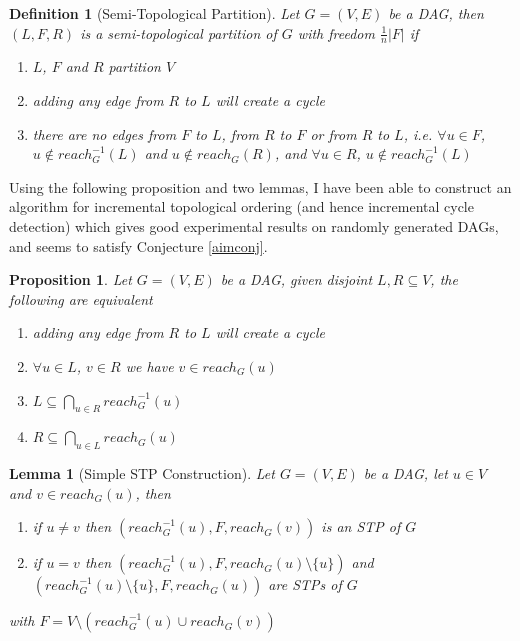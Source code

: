 \documentclass{article}
\newtheorem{lemma}[theorem]{Lemma}
\newtheorem{proposition}[theorem]{Proposition}
\newtheorem{definition}[theorem]{Definition}
\begin{document}
\begin{definition}[Semi-Topological Partition]
Let $G=(V,E)$ be a DAG, then $(L,F,R)$ is a \textit{semi-topological partition} of $G$ with \textit{freedom} $\frac{1}{n} \vert F \vert$ if
\begin{enumerate}
\item $L$, $F$ and $R$ partition $V$
\item adding any edge from $R$ to $L$ will create a cycle
\item there are no edges from $F$ to $L$, from $R$ to $F$ or from $R$ to $L$, i.e. $\forall u \in F$, $u \notin reach_{G}^{-1}(L)$ and $u \notin reach_{G}(R)$, and $\forall u \in R$, $u \notin reach_{G}^{-1}(L)$ 
\end{enumerate}
\end{definition}

Using the following proposition and two lemmas, I have been able to construct an algorithm for incremental topological ordering (and hence incremental cycle detection) which gives good experimental results on randomly generated DAGs, and seems to satisfy Conjecture \ref{aimconj}.

\begin{proposition}
Let $G=(V,E)$ be a DAG, given disjoint $L,R \subseteq V$, the following are equivalent
\begin{enumerate}
\item adding any edge from $R$ to $L$ will create a cycle
\item $\forall u \in L$, $v \in R$ we have $v \in reach_{G}(u)$
\item $L \subseteq \bigcap_{u \in R} reach_{G}^{-1}(u)$
\item $R \subseteq \bigcap_{u \in L} reach_{G}(u)$
\end{enumerate}
\end{proposition}

\begin{lemma}[Simple STP Construction]
Let $G=(V,E)$ be a DAG, let $u \in V$ and $v \in reach_{G}(u)$, then
\begin{enumerate}
\item if $u \neq v$ then $(reach_{G}^{-1}(u),F,reach_{G}(v))$ is an STP of $G$
\item if $u = v$ then $(reach_{G}^{-1}(u),F,reach_{G}(u) \setminus{\{u\}})$ and $(reach_{G}^{-1}(u) \setminus{\{u\}},F,reach_{G}(u))$ are STPs of $G$
\end{enumerate}
with $F=V \setminus (reach_{G}^{-1}(u) \cup reach_{G}(v))$
\end{lemma}
\end{document}
